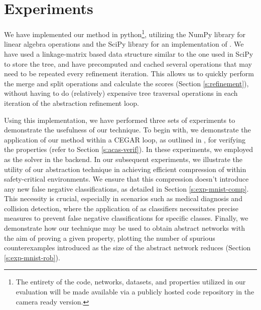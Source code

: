 \section{Experiments} 



We have implemented our method in python\footnote{The entirety of the code,
networks, datasets, and properties utilized in our evaluation will be made
available via a publicly hosted code repository in the camera ready version.}, 
utilizing the NumPy library for linear algebra
operations and the SciPy library for an implementation of \hcluster.
We have used a linkage-matrix based data structure similar to the one used in
SciPy to store the tree, and have precomputed and cached several
operations that may need to be repeated every refinement iteration. This allows
us to quickly perform the merge and split operations and calculate the
scores (Section \ref{s:refinement}), without having to do (relatively)
expensive tree traversal operations in each iteration of the abstraction
refinement loop. 

Using this implementation, we have performed three sets of experiments to
demonstrate the usefulness of our technique. To begin with, we demonstrate 
the application of our method within a CEGAR loop, as outlined in \cite{cegar-nn}, 
for verifying the \acasxu properties (refer to Section \ref{s:acas-verif}). 
In these experiments, we employed \neuralsat as the solver in the backend.
In our subsequent experiments, we illustrate the utility of our abstraction 
technique in achieving efficient compression of \dnn within safety-critical 
environments. We ensure that this compression doesn't introduce any new 
false negative classifications, as detailed in Section \ref{s:exp-mnist-comp}. 
This necessity is crucial, especially in scenarios such as medical diagnosis 
and collision detection, where the application of \dnn as classifiers necessitates 
precise measures to prevent false negative classifications for specific classes.
Finally, we demonstrate how our technique may be used to obtain abstract 
networks with the aim of proving a given property, plotting the number of 
spurious counterexamples introduced as the size of the abstract network 
reduces (Section \ref{s:exp-mnist-rob}). 

